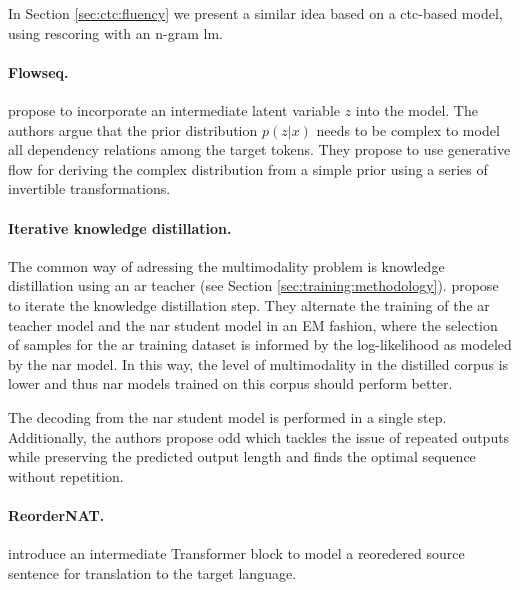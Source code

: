 In Section \ref{sec:ctc:fluency} we present a similar idea based on a
\ac{ctc}-based model, using rescoring with an n-gram \acl{lm}.

\paragraph{Flowseq.} %
\citet{ma-etal-2019-flowseq} propose to incorporate an intermediate latent
variable $z$ into the model. The authors argue that the prior distribution
$p(z|x)$ needs to be complex to model all dependency relations among the target
tokens. They propose to use generative flow \citep{rezende2015variational} for
deriving the complex distribution from a simple prior using a series of
invertible transformations. 

\paragraph{Iterative knowledge distillation.}
The common way of adressing the multimodality problem is knowledge distillation
using an \acl{ar} teacher (see Section \ref{sec:training:methodology}).
\citet{sun2020em} propose to iterate the knowledge distillation step. They
alternate the training of the \ac{ar} teacher model and the \ac{nar} student
model in an EM fashion, where the selection of samples for the \ac{ar} training
dataset is informed by the log-likelihood as modeled by the \ac{nar} model. In
this way, the level of multimodality in the distilled corpus is lower and thus
\ac{nar} models trained on this corpus should perform better.

The decoding from the \ac{nar} student model is performed in a single step.
Additionally, the authors propose \acf{odd} which tackles the issue of repeated
outputs while preserving the predicted output length and finds the optimal
sequence without repetition.

\paragraph{ReorderNAT.} \citet{ran-etal-2021-guiding} introduce an intermediate
Transformer block to model a reoredered source sentence for translation to the
target language.

